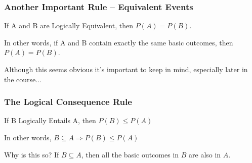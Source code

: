 \documentclass{beamer}
\begin{document}
\begin{frame}
\frametitle{Another Important Rule -- Equivalent Events}

\begin{block}{If A and B are Logically Equivalent, then $P(A) = P(B)$.}\end{block}

\begin{alertblock}{In other words, if A and B contain exactly the same basic outcomes, then $P(A) = P(B)$.}\end{alertblock}

Although this seems obvious it's important to keep in mind, especially later in the course...
\end{frame}
\begin{frame}
\frametitle{The Logical Consequence Rule}

\begin{block}{If B Logically Entails A, then $P(B)\leq P(A)$}\end{block}

\begin{alertblock}{In other words, $B\subseteq A \Rightarrow P(B)\leq P(A)$}\end{alertblock}


\begin{block}{Why is this so?}
If $B \subseteq A$, then all the basic outcomes in $B$ are also in $A$.
\end{block}

\end{frame}
\end{document}
